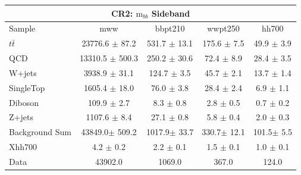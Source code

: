 \documentclass{beamer}
\newcommand*{\ttbar}{\ensuremath{t\bar{t}}\xspace}
\newcommand*{\mbb}{\ensuremath{\text{m}_{bb}}\xspace}
\newcommand*{\header}[1]{\fontsize{16}{8}\selectfont \textbf{{\color{MyPurple}{#1}}}}
\begin{document}
\begin{frame}
\begin{center}
\header{CR2 700}
\end{center}
\begin{table}
\tiny
\begin{tabular}{l|c|c|c|c}
\hline\hline
\multicolumn{5}{c}{\textbf{CR2}: \mbb Sideband}\\\hline\hline
Sample  	& mww 	& bbpt210 	& wwpt250 	& hh700   \\\hline
\ttbar 	& 23776.6 $\pm$ 87.2 	& 531.7 $\pm$ 13.1 	& 175.6 $\pm$ 7.5 	& 49.9 $\pm$ 3.9 	\\\hline 
QCD 	& 13310.5 $\pm$ 500.3 	& 250.2 $\pm$ 30.6 	& 72.4 $\pm$ 8.9 	& 28.4 $\pm$ 3.5 		\\\hline 
W+jets 	& 3938.9 $\pm$ 31.1 	& 124.7 $\pm$ 3.5 	& 45.7 $\pm$ 2.1 	& 13.7 $\pm$ 1.4 	\\\hline 
SingleTop 	& 1605.4 $\pm$ 18.0 	& 76.0 $\pm$ 3.8 	& 28.4 $\pm$ 2.4 	& 6.9 $\pm$ 1.1 		\\\hline 
Diboson 	& 109.9 $\pm$ 2.7 	& 8.3 $\pm$ 0.8 	& 2.8 $\pm$ 0.5 	& 0.7 $\pm$ 0.2 		\\\hline 
Z+jets 	& 1107.6 $\pm$ 8.4 	& 27.1 $\pm$ 0.8 	& 5.8 $\pm$ 0.4 	& 2.0 $\pm$ 0.3 		\\\hline 
\hline
Background Sum 	& 43849.0$\pm$ 509.2 	& 1017.9$\pm$ 33.7 	& 330.7$\pm$ 12.1 	& 101.5$\pm$ 5.5 	\\\hline 
\hline
Xhh700 	& 4.2 $\pm$ 0.2 	& 2.2 $\pm$ 0.1 	& 1.5 $\pm$ 0.1 	& 1.0 $\pm$ 0.1 	\\\hline 
Data 	& 43902.0 	& 1069.0 	& 367.0 	& 124.0	\\\hline 
\end{tabular}
\end{table}
\end{frame}
\end{document}
